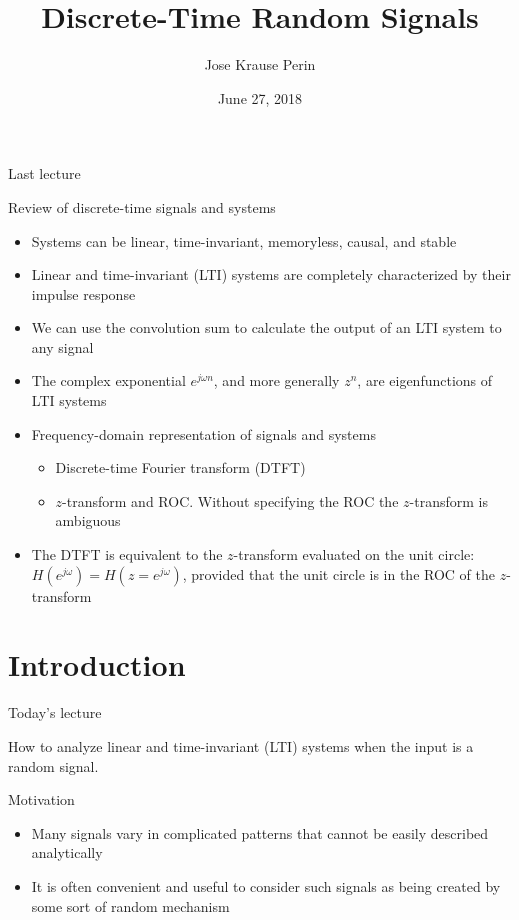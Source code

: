 \documentclass[10pt, aspectratio=169]{beamer}
\title[EE 264]{Discrete-Time Random Signals}
\author{Jose Krause Perin}
\institute{Stanford University}
\date{June 27, 2018}
\begin{document}
\begin{frame}
  \titlepage
\end{frame}

\begin{frame}{Last lecture}

\begin{block}{Review of discrete-time signals and systems}
	\begin{itemize}
		\item Systems can be linear, time-invariant, memoryless, causal, and stable \\
		\item Linear and time-invariant (LTI) systems are completely characterized by their impulse response
		\item We can use the convolution sum to calculate the output of an LTI system to any signal \\
		\item The complex exponential $e^{j\omega n}$, and more generally $z^n$, are eigenfunctions of LTI systems
		\item Frequency-domain representation of signals and systems
		\begin{itemize}\normalsize
			\item Discrete-time Fourier transform (DTFT)
			\item $z$-transform and ROC. Without specifying the ROC the $z$-transform is ambiguous
		\end{itemize}
		\item The DTFT is equivalent to the $z$-transform evaluated on the unit circle: $H(e^{j\omega}) = H(z = e^{j\omega})$, provided that the unit circle is in the ROC of the $z$-transform
	\end{itemize}
\end{block}

\end{frame}


\section{Introduction}
\begin{frame}{Today's lecture} 

How to analyze linear and time-invariant (LTI) systems when the input is a random signal.

\begin{block}{Motivation}
	\begin{itemize}
		\item Many signals vary in complicated patterns that
		cannot be easily described analytically
		\item It is often convenient and useful to consider
		such signals as being created by some sort of
		random mechanism
	\end{itemize}   	
\end{block}
\end{frame}
\end{document}
